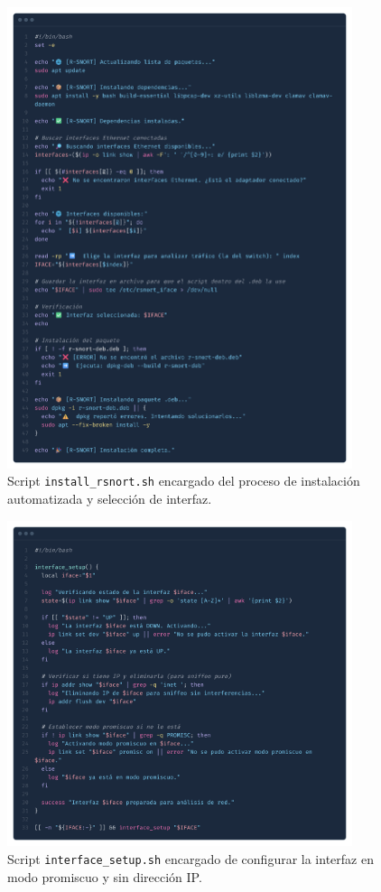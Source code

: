 \documentclass[11pt,a4paper,twoside]{report}
\begin{document}
\begin{figure}[H]
	\centering
	\includegraphics[width=0.9\textwidth]{script_automatico/18.png}
	\caption{Script \texttt{install\_rsnort.sh} encargado del proceso de instalación automatizada y selección de interfaz.}
	\label{fig:install_rsnort}
\end{figure}

\begin{figure}[H]
	\centering
	\includegraphics[width=0.9\textwidth]{script_automatico/19.png}
	\caption{Script \texttt{interface\_setup.sh} encargado de configurar la interfaz en modo promiscuo y sin dirección IP.}
	\label{fig:interface_setup}
\end{figure}
\end{document}
